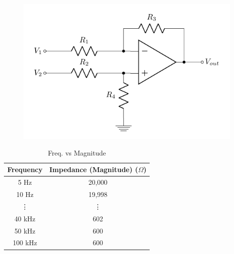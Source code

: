 \documentclass[12pt]{article}
\begin{document}
	\begin{figure}[H] %
		\centering
		\includegraphics{diffamp}
		\caption{\rajah}
		\label{fig:diffamp3}
	\end{figure}
	
	\begin{table}[H]
		\centering
		\caption{Freq. vs Magnitude \\ }
		\begin{tabular}{cc}
			\toprule
			\multicolumn{1}{l}{\textbf{Frequency}} & \multicolumn{1}{l}{\textbf{Impedance (Magnitude) ($\Omega$)}} \\
			\midrule
			5 Hz  & 20,000 \\
			10 Hz & 19,998 \\
			\vdots     & \vdots \\
			40 kHz & 602 \\
			50 kHz & 600 \\
			100 kHz & 600 \\
			\bottomrule
		\end{tabular}
		\label{table:freqmag}%
	\end{table}%
	
\end{document}

